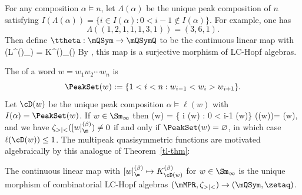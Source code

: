 For any composition $\alpha\vDash n$, let $\Lambda(\alpha)$ be the 
unique peak composition of $n$ satisfying $ I(\Lambda(\alpha)) = \{ i \in I(\alpha) : 0 < i-1 \notin I(\alpha)\}.$
For example, one has \[\Lambda((1,2,1,1,1,3,1)) = (3,6,1).\] 
Then define
$\ttheta : \mQSym \to \mQSymQ$
to
be the continuous linear map with 
\be\label{ttheta-eq} 
\ttheta(L^{(\beta)}_\alpha) = K^{(\beta)}_{\Lambda(\alpha)}
\quad{}
\ee
By \cite[Cor.~4.22]{LM2019},
this map is a surjective morphism of LC-Hopf algebras.

The  of a word $w=w_1w_2\cdots w_n$ is 
\[\PeakSet(w) := \{1<i<n : w_{i-1} < w_i > w_{i+1}\}.\]
Let $\cD(w)$ be the unique peak composition $\alpha\vDash\ell(w)$ with $I(\alpha) = \PeakSet(w)$.
If $w \in \Sm_\infty$ then 
\be\label{peakset-eq}
\PeakSet(w) = \{ i \in \Des(w) : 0 < i-1 \notin \Des(w)\}\quad{}\quad 
\Lambda(\cC(w))=   \cD(w),\ee
and we have
$ \zeta_{>|<}([w]^{(\beta)}_\m) \neq 0$ if and only if $\PeakSet(w) = \varnothing$, in which case $\ell(\cD(w))\leq 1$.
The multipeak quasisymmetric functions are motivated algebraically by this analogue of Theorem~\ref{tl-thm}:


\begin{theorem}\label{peak-tl-thm}
The continuous linear map with $[w]^{(\beta)}_\m \mapsto K^{(\beta)}_{\cD(w)}$ for $w \in \Sm_\infty$
is the unique morphism of 
combinatorial LC-Hopf algebras 
$(\mMPR,\zeta_{>|<}) \to (\mQSym, \zetaq)$.
\end{theorem}

